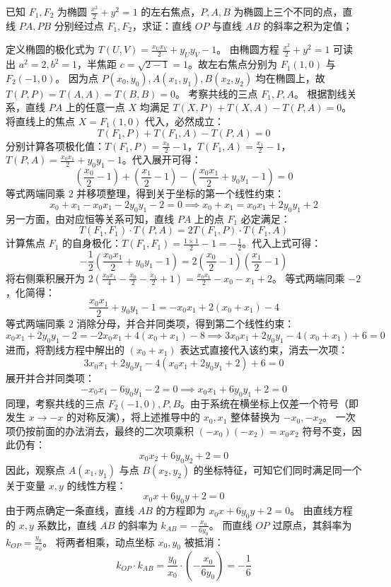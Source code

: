 \begin{exercise}
已知 \(F_1, F_2\) 为椭圆 \(\frac{x^2}{2} + y^2 = 1\) 的左右焦点，\(P, A, B\) 为椭圆上三个不同的点，直线 \(PA, PB\) 分别经过点 \(F_1, F_2\)，求证：直线 \(OP\) 与直线 \(AB\) 的斜率之积为定值；
\end{exercise}
\begin{solution}
定义椭圆的极化式为 $T(U,V) = \frac{x_U x_V}{2} + y_U y_V - 1$。
由椭圆方程 $\frac{x^2}{2} + y^2 = 1$ 可读出 $a^2=2, b^2=1$，半焦距 $c = \sqrt{2-1} = 1$。故左右焦点分别为 $F_1(1,0)$ 与 $F_2(-1,0)$。
因为点 $P(x_0,y_0), A(x_1,y_1), B(x_2,y_2)$ 均在椭圆上，故 $T(P,P) = T(A,A) = T(B,B) = 0$。
考察共线的三点 $F_1, P, A$。
根据割线关系，直线 $PA$ 上的任意一点 $X$ 均满足 $T(X,P) + T(X,A) - T(P,A) = 0$。
将直线上的焦点 $X = F_1(1,0)$ 代入，必然成立：
$$ T(F_1, P) + T(F_1, A) - T(P, A) = 0 $$
分别计算各项极化值：$T(F_1, P) = \frac{x_0}{2} - 1$，$T(F_1, A) = \frac{x_1}{2} - 1$，$T(P, A) = \frac{x_0 x_1}{2} + y_0 y_1 - 1$。代入展开可得：
$$ \left(\frac{x_0}{2} - 1\right) + \left(\frac{x_1}{2} - 1\right) - \left(\frac{x_0 x_1}{2} + y_0 y_1 - 1\right) = 0 $$
等式两端同乘 $2$ 并移项整理，得到关于坐标的第一个线性约束：
$$ x_0 + x_1 - x_0 x_1 - 2y_0 y_1 - 2 = 0 \implies x_0 + x_1 = x_0 x_1 + 2y_0 y_1 + 2 $$
另一方面，由对应恒等关系可知，直线 $PA$ 上的点 $F_1$ 必定满足：
$$ T(F_1, F_1) \cdot T(P, A) = 2 T(F_1, P) \cdot T(F_1, A) $$
计算焦点 $F_1$ 的自身极化：$T(F_1, F_1) = \frac{1 \times 1}{2} - 1 = -\frac{1}{2}$。代入上式可得：
$$ -\frac{1}{2} \left(\frac{x_0 x_1}{2} + y_0 y_1 - 1\right) = 2 \left(\frac{x_0}{2} - 1\right) \left(\frac{x_1}{2} - 1\right) $$
将右侧乘积展开为 $2 \left(\frac{x_0 x_1}{4} - \frac{x_0}{2} - \frac{x_1}{2} + 1\right) = \frac{x_0 x_1}{2} - x_0 - x_1 + 2$。
等式两端同乘 $-2$，化简得：
$$ \frac{x_0 x_1}{2} + y_0 y_1 - 1 = -x_0 x_1 + 2(x_0 + x_1) - 4 $$
等式两端同乘 $2$ 消除分母，并合并同类项，得到第二个线性约束：
$$ x_0 x_1 + 2y_0 y_1 - 2 = -2x_0 x_1 + 4(x_0 + x_1) - 8 \implies 3x_0 x_1 + 2y_0 y_1 - 4(x_0 + x_1) + 6 = 0 $$
进而，将割线方程中解出的 $(x_0 + x_1)$ 表达式直接代入该约束，消去一次项：
$$ 3x_0 x_1 + 2y_0 y_1 - 4(x_0 x_1 + 2y_0 y_1 + 2) + 6 = 0 $$
展开并合并同类项：
$$ -x_0 x_1 - 6y_0 y_1 - 2 = 0 \implies x_0 x_1 + 6y_0 y_1 + 2 = 0 $$
同理，考察共线的三点 $F_2(-1,0), P, B$。由于系统在横坐标上仅差一个符号（即发生 $x \to -x$ 的对称反演），将上述推导中的 $x_0, x_1$ 整体替换为 $-x_0, -x_2$。
一次项仍按前面的办法消去，最终的二次项乘积 $(-x_0)(-x_2) = x_0 x_2$ 符号不变，因此仍有：
$$ x_0 x_2 + 6y_0 y_2 + 2 = 0 $$
因此，观察点 $A(x_1, y_1)$ 与点 $B(x_2, y_2)$ 的坐标特征，可知它们同时满足同一个关于变量 $x, y$ 的线性方程：
$$ x_0 x + 6y_0 y + 2 = 0 $$
由于两点确定一条直线，直线 $AB$ 的方程即为 $x_0 x + 6y_0 y + 2 = 0$。
由直线方程的 $x,y$ 系数比，直线 $AB$ 的斜率为 $k_{AB} = -\frac{x_0}{6y_0}$。
而直线 $OP$ 过原点，其斜率为 $k_{OP} = \frac{y_0}{x_0}$。
将两者相乘，动点坐标 $x_0, y_0$ 被抵消：
$$ k_{OP} \cdot k_{AB} = \frac{y_0}{x_0} \cdot \left( -\frac{x_0}{6y_0} \right) = -\frac{1}{6} $$
\end{solution}

